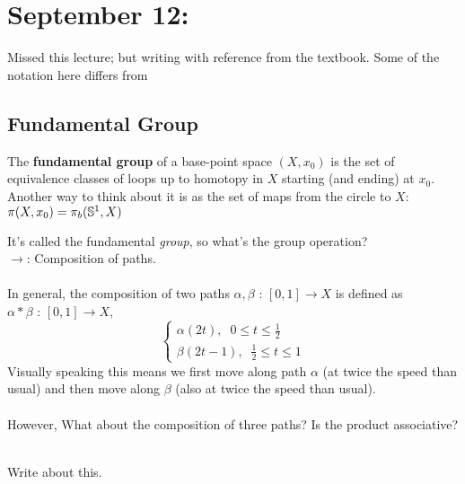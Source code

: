 \documentclass[11pt]{article}
\begin{document}
\newpage
\section{September 12: }

\begin{note}
  {Missed this lecture; but writing with reference from the textbook. Some of the notation here differs from \cite{FomenkoFuchs16}} 
\end{note}

\subsection{Fundamental Group}

\begin{redbox}
  \begin{definition}
    The \textbf{fundamental group} of a base-point space $(X, x_0)$ is the set of equivalence classes of loops up to homotopy in $X$ starting (and ending) at $x_0$. Another way to think about it is as the set of maps from the circle to $X$: $\pi(X, x_0) = \pi_b(\mathbb{S}^1,  X)$
  \end{definition}
\end{redbox} It's called the fundamental \textit{group}, so what's the group operation? \\
$\rightarrow$: Composition of paths.
\\
\\
In general, the composition of two paths $\alpha, \beta \text{ : } [0, 1] \rightarrow X$ is defined as $\alpha * \beta \text{ : } [0, 1] \rightarrow X$,
$$ \begin{cases}
  \alpha(2t),\;\;0 \leq t \leq \frac{1}{2} \\
  \beta(2t - 1),\;\; \frac{1}{2} \leq t \leq 1
\end{cases} $$ 
Visually speaking this means we first move along path $\alpha$ (at twice the speed than usual) and then move along $\beta$ (also at twice the speed than usual). 
\\
\\
However, What about the composition of three paths? Is the product associative?
\\
\\
\begin{note}
  {Write about this.}
\end{note}
\\
\\
\end{document}
